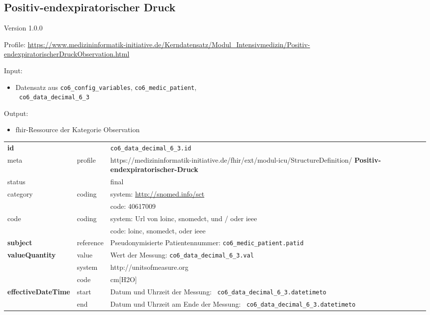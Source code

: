 \subsection{Positiv-endexpiratorischer Druck} 
\noindent Version 1.0.0

\noindent Profile: \url{https://www.medizininformatik-initiative.de/Kerndatensatz/Modul_Intensivmedizin/Positiv-endexpiratorischerDruckObservation.html}

\noindent Input:
\begin{itemize}
	\item Datensatz aus \texttt{co6\_config\_variables}, \texttt{co6\_medic\_patient}, \\ \texttt{
co6\_data\_decimal\_6\_3}
\end{itemize}
Output:
\begin{itemize}
        \item \ac{fhir}-Ressource der Kategorie \glqq Observation\grqq{}
\end{itemize}
\begin{longtable}{|l|l|p{7.5cm}|}
        \hline
        \rowcolor{lightgray} \multicolumn{3}{|l|}{Data Mapping (inhaltlich)} \\ \hline
        \textbf{id} &  & \texttt{co6\_data\_decimal\_6\_3.id} \\ \hline
	meta & profile & https://medizininformatik-initiative.de/fhir/ext/modul-icu/StructureDefinition/\textbf{
Positiv-endexpiratorischer-Druck} \\ \hline 
	status &  & final   \\ \hline 
	category & coding & system: \url{http://snomed.info/sct} \\
\cline{3-3}
	& & code: 40617009 \\ \hline
	code & coding & system: Url von \ac{loinc}, \ac{snomedct}, und / oder \ac{ieee} \\ 
	\cline{3-3} 
	 &  & code: \ac{loinc}, \ac{snomedct}, oder \ac{ieee} \\ \hline
	 \textbf{subject}  & reference & Pseudonymisierte Patientennummer: \texttt{co6\_medic\_patient.patid} \\ \hline
	 \textbf{valueQuantity}  & value & Wert der Messung: \texttt{co6\_data\_decimal\_6\_3.val} \\
        \cline{2-3}
         & system & http://unitsofmeasure.org \\
         \cline{2-3}
         & code & cm[H2O] \\ \hline
     \textbf{effectiveDateTime}  & start & Datum und Uhrzeit der Messung: \texttt{
co6\_data\_decimal\_6\_3.datetimeto} \\
    \cline{2-3}
     & end & Datum und Uhrzeit am Ende der Messung: \texttt{
co6\_data\_decimal\_6\_3.datetimeto} \\ \hline
\end{longtable}



